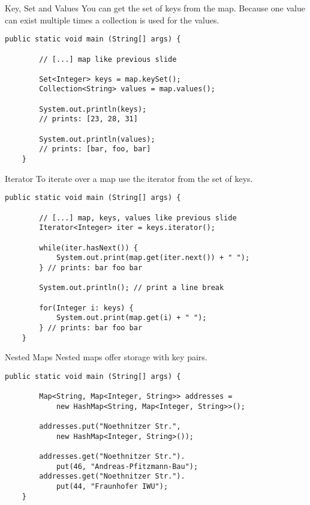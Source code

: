 \begin{frame}[fragile]{Key, Set and Values}
    You can get the set of keys from the map.
    Because one value can exist multiple times a collection is used for the values.
    \begin{lstlisting}[basicstyle=\ttfamily\scriptsize]
    public static void main (String[] args) {
    
        // [...] map like previous slide
        
        Set<Integer> keys = map.keySet();
        Collection<String> values = map.values();
        
        System.out.println(keys);
        // prints: [23, 28, 31]
        
        System.out.println(values);
        // prints: [bar, foo, bar]
    }
    \end{lstlisting}
\end{frame}

\begin{frame}[fragile]{Iterator}
    To iterate over a map use the iterator from the set of keys.
    \begin{lstlisting}[basicstyle=\ttfamily\scriptsize]
    public static void main (String[] args) {
    
        // [...] map, keys, values like previous slide            
        Iterator<Integer> iter = keys.iterator();
        
        while(iter.hasNext()) {
            System.out.print(map.get(iter.next()) + " ");
        } // prints: bar foo bar
        
        System.out.println(); // print a line break
        
        for(Integer i: keys) {
            System.out.print(map.get(i) + " ");
        } // prints: bar foo bar
    }
    \end{lstlisting}
\end{frame}

\begin{frame}[fragile]{Nested Maps}
    Nested maps offer storage with key pairs.
    \begin{lstlisting}[basicstyle=\ttfamily\scriptsize]
    public static void main (String[] args) {        
    
        Map<String, Map<Integer, String>> addresses = 
            new HashMap<String, Map<Integer, String>>();
        
        addresses.put("Noethnitzer Str.", 
            new HashMap<Integer, String>());
        
        addresses.get("Noethnitzer Str.").
            put(46, "Andreas-Pfitzmann-Bau");
        addresses.get("Noethnitzer Str.").
            put(44, "Fraunhofer IWU");
    }
    \end{lstlisting}
\end{frame}

